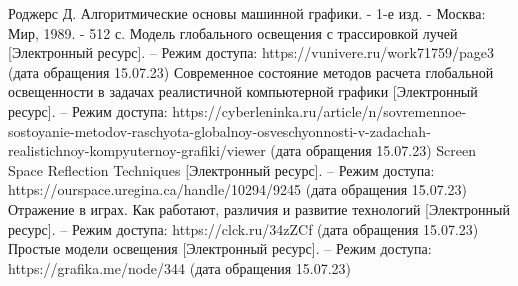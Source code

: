 \documentclass[a4paper,14pt, unknownkeysallowed]{extreport}
\begin{document}
\begin{thebibliography}{9}
	Роджерс Д. Алгоритмические основы машинной графики. - 1-е изд. - Москва: Мир, 1989. - 512 с.
	Модель глобального освещения с трассировкой лучей [Электронный ресурс]. – Режим доступа: https://vunivere.ru/work71759/page3 (дата обращения 15.07.23)
	Современное состояние методов расчета глобальной освещенности в задачах реалистичной компьютерной графики [Электронный ресурс]. – Режим доступа: https://cyberleninka.ru/article/n/sovremennoe-sostoyanie-metodov-raschyota-globalnoy-osveschyonnosti-v-zadachah-realistichnoy-kompyuternoy-grafiki/viewer (дата обращения 15.07.23)
	Screen Space Reflection Techniques [Электронный ресурс]. – Режим доступа: https://ourspace.uregina.ca/handle/10294/9245 (дата обращения 15.07.23)
	Отражение в играх. Как работают, различия и развитие технологий [Электронный ресурс]. – Режим доступа: https://clck.ru/34zZCf (дата обращения 15.07.23)
	Простые модели освещения  [Электронный ресурс]. – Режим доступа: https://grafika.me/node/344 (дата обращения 15.07.23)
\end{thebibliography}

\end{document}
